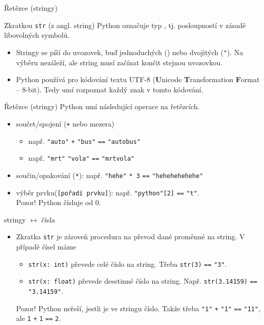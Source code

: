 \documentclass[aspectratio=169,11pt]{beamer}
\begin{document}
\begin{frame}{Řetězce (stringy)}
 \begin{tcolorbox}[title=Datový typ \texttt{str}]
  Zkratkou \alert{\texttt{str}} (z angl. \alert{str}ing) Python označuje typ
  , tj. posloupností v zásadě libovolných symbolů.
 \end{tcolorbox}
 \begin{itemize}
  \item<2-> Stringy se píší do uvozovek, buď jednoduchých
   (\texttt{\textquotesingle}) nebo dvojitých (\texttt{"}). Na výběru nezáleží,
   ale string musí začínat končit stejnou uvozovkou.
  \item<3-> Python používá pro kódování textu UTF-8 (\textbf{U}nicode
   \textbf{T}ransformation \textbf{F}ormat -- 8-bit). Tedy umí rozpoznat každý
   znak v tomto kódování.
 \end{itemize}\end{frame}

\begin{frame}{Řetězce (stringy)}
 Python umí následující operace na řetězcích.
 \begin{itemize}
  \item<1-> součet/spojení (\texttt{+} nebo mezera)
   \begin{itemize}
    \item např. \texttt{"auto"} \texttt{+} \texttt{"bus"} \texttt{==}
     \texttt{"autobus"}
    \item např. \texttt{"mrt"} \texttt{"vola"} \texttt{==} \texttt{"mrtvola"}
   \end{itemize}
  \item<2-> součin/opakování (\texttt{*}): např. \texttt{"hehe"} \texttt{* 3}
   \texttt{==} \texttt{"hehehehehehe"}
  \item<3-> výběr prvku(\texttt{[pořadí prvku]}): např. \texttt{"python"[2]}
   \texttt{==} \texttt{"t"}.\\
   \alert{Pozor!} Python čísluje od 0.
 \end{itemize}
\end{frame}

\begin{frame}{stringy $\leftrightarrow$ čísla}
 \begin{itemize}
  \item Zkratka \texttt{str} je zároveň procedura na převod dané proměnné na
   string. V případě čísel máme
   \begin{itemize}
    \item \texttt{str(x: int)} převede celé číslo na string. Třeba
     \texttt{str(3)} \texttt{==} \texttt{"3"}.
    \item \texttt{str(x: float)} převede desetinné číslo na string. Např. 
     \texttt{str(3.14159)} \texttt{==} \texttt{"3.14159"}.
   \end{itemize}
   \alert{Pozor!} Python neřeší, jestli je ve stringu číslo. Takže třeba
   \texttt{"1"} \texttt{+} \texttt{"1"} \texttt{==} \texttt{"11"}, ale
   \texttt{1} \texttt{+} \texttt{1} \texttt{==} \texttt{2}.
 \end{itemize}
\end{frame}
\end{document}
